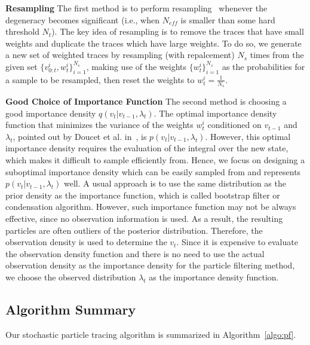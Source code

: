\textbf{Resampling} The first method is to perform resampling~\cite{doucet2001sequential, gordon:107} whenever the degeneracy becomes significant (i.e., when $N_{eff}$ is smaller than some hard threshold $N_t$). The key idea of resampling is to remove the traces that have small weights and duplicate the traces which have large weights. To do so, we generate a new set of weighted traces by resampling (with repalcement) $N_s$ times from the given set $\{ v_{0:t}^i,w_t^i\} _{i = 1}^{{N_s}}$, making use of the weights $\{w_t^i\} _{i = 1}^{{N_s}}$ as the probabilities for a sample to be resampled, then reset the weights to $w_t^i = \frac{1}{{{N_s}}}$.

\textbf{Good Choice of Importance Function} The second method is choosing a good importance density $q({v_t}|{v_{t - 1}},{\lambda_t})$. The optimal importance density function that minimizes the variance of the weights $w_t^i$ conditioned on $v_{t-1}$ and $\lambda_t$, pointed out by Doucet et al. in~\cite{Doucet00onsequential}, is $p(v_t|v_{t-1}, \lambda_t)$. However, this optimal importance density requires the evaluation of the integral over the new state, which makes it difficult to sample efficiently from. Hence, we focus on designing a suboptimal importance density which can be easily sampled from and represents $p(v_t|v_{t-1}, \lambda_t)$ well. A usual approach is to use the same distribution as the prior density as the importance function, which is called bootstrap filter or condensation algorithm. However, such importance function may not be always effective, since no observation information is used. As a result, the resulting particles are often outliers of the posterior distribution. Therefore, the observation density is used to determine the $v_t$. Since it is expensive to evaluate the observation density function and there is no need to use the actual observation density as the importance density for the particle filtering method, we choose the observed distribution $\lambda_t$ as the importance density function.

\subsection{Algorithm Summary}

Our stochastic particle tracing algorithm is summarized in Algorithm~\ref{algo:pf}.

